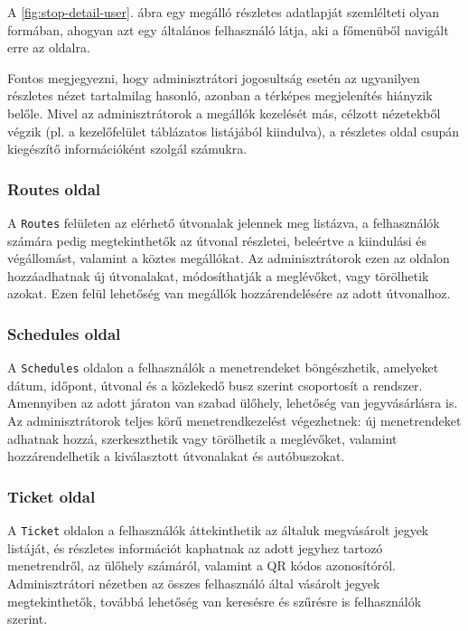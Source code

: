 A \ref{fig:stop-detail-user}. ábra egy megálló részletes adatlapját szemlélteti olyan formában, ahogyan azt egy általános felhasználó látja, aki a főmenüből navigált erre az oldalra.

Fontos megjegyezni, hogy adminisztrátori jogosultság esetén az ugyanilyen részletes nézet tartalmilag hasonló, azonban a térképes megjelenítés hiányzik belőle. Mivel az adminisztrátorok a megállók kezelését más, célzott nézetekből végzik (pl. a kezelőfelület táblázatos listájából kiindulva), a részletes oldal csupán kiegészítő információként szolgál számukra.


\subsubsection{Routes oldal}

A \texttt{Routes} felületen az elérhető útvonalak jelennek meg listázva, a felhasználók számára pedig megtekinthetők az útvonal részletei, beleértve a kiindulási és végállomást, valamint a köztes megállókat. Az adminisztrátorok ezen az oldalon hozzáadhatnak új útvonalakat, módosíthatják a meglévőket, vagy törölhetik azokat. Ezen felül lehetőség van megállók hozzárendelésére az adott útvonalhoz.

\subsubsection{Schedules oldal}

A \texttt{Schedules} oldalon a felhasználók a menetrendeket böngészhetik, amelyeket dátum, időpont, útvonal és a közlekedő busz szerint csoportosít a rendszer. Amennyiben az adott járaton van szabad ülőhely, lehetőség van jegyvásárlásra is. Az adminisztrátorok teljes körű menetrendkezelést végezhetnek: új menetrendeket adhatnak hozzá, szerkeszthetik vagy törölhetik a meglévőket, valamint hozzárendelhetik a kiválasztott útvonalakat és autóbuszokat.

\subsubsection{Ticket oldal}

A \texttt{Ticket} oldalon a felhasználók áttekinthetik az általuk megvásárolt jegyek listáját, és részletes információt kaphatnak az adott jegyhez tartozó menetrendről, az ülőhely számáról, valamint a QR kódos azonosítóról. Adminisztrátori nézetben az összes felhasználó által vásárolt jegyek megtekinthetők, továbbá lehetőség van keresésre és szűrésre is felhasználók szerint.

